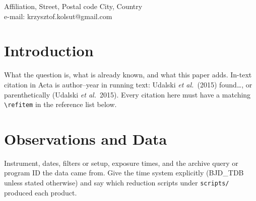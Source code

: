 \documentclass{acta}
\begin{document}
\begin{Titlepage}


       {Affiliation, Street, Postal code City, Country\\
        e-mail: krzysztof.kolsut@gmail.com}


\end{Titlepage}


\section{Introduction}

What the question is, what is already known, and what this paper adds.
In-text citation in Acta is author--year in running text: Udalski
\textit{et al.\ }(2015) found\dots, or parenthetically (Udalski
\textit{et al.\ }2015). Every citation here must have a matching
\verb|\refitem| in the reference list below.

\section{Observations and Data}

Instrument, dates, filters or setup, exposure times, and the archive query
or program ID the data came from. Give the time system explicitly
(BJD\_TDB unless stated otherwise) and say which reduction scripts under
\texttt{scripts/} produced each product.
\end{document}
